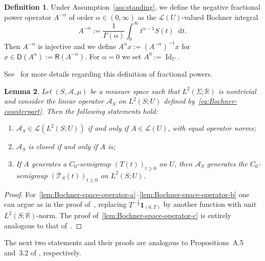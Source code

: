 \documentclass[reqno]{amsart}
\numberwithin{equation}{section}
\newcommand{\R}{\mathbb{R}}
\newcommand{\cA}{\mathcal{A}}
\newcommand{\cT}{\mathcal{T}}
\newcommand{\rd}{\mathop{}\!\mathrm{d}}
\newcommand{\id}{\operatorname{Id}}
\newtheorem{lemma}{Lemma}[section]
\theoremstyle{remark}
\theoremstyle{definition}
\newtheorem{definition}[lemma]{Definition}
\begin{document}
\begin{definition}\label{def:frac-power-Hille-Phillips}
	Under Assumption~\ref{ass:standing}, we define
	the negative fractional power operator $A^{-\alpha}$ of order $\alpha \in (0,\infty)$ 
	as the $\mathscr L(U)$-valued Bochner integral
	\begin{equation}\label{eq:def-frac-power-Hille-Phillips}
		A^{-\alpha}
		:=
		\frac{1}{\Gamma(\alpha)}
		\int_0^\infty 
		t^{\alpha-1} S(t) \rd t.
	\end{equation}
	Then $A^{-\alpha}$ is injective and we define
	$A^\alpha x := (A^{-\alpha})^{-1} x$ for 
	$x \in \mathsf D(A^\alpha) := \mathsf R(A^{-\alpha})$.
	For $\alpha = 0$ we set $A^0 := \id_U$.
\end{definition}
%
See~\cite[Section~2.6]{Pazy1983} for more details regarding
this definition of fractional powers.

\begin{lemma}\label{lem:Bochner-space-operator}
	Let $(S, \mathscr A, \mu)$ be a measure space
	such that $L^2(\Sigma; \R)$ is nontrivial and consider the linear
	operator $\cA_S$ on $L^2(S; U)$
	defined by~\eqref{eq:Bochner-counterpart}.
	Then the following statements hold:
	\begin{enumerate}[leftmargin=1cm, label={\normalfont(\alph*)}]
		\item\label{lem:Bochner-space-operator-a} 
		$\mathcal A_S \in \mathscr L(L^2(S; U))$ if and only if 
		$A \in \mathscr L(U)$, with equal operator norms;
		\item\label{lem:Bochner-space-operator-b}
		$\mathcal A_S$ is closed if and only if $A$ is;
		\item \label{lem:Bochner-space-operator-c}
		If $A$ generates a $C_0$-semigroup $(T(t))_{t\ge0}$ on $U$, 
		then
		$\cA_S$ generates the $C_0$-semigroup $(\cT_S(t))_{t\ge0}$ on 
		$L^2(S; U)$.
	\end{enumerate}
\end{lemma}

\begin{proof}
	For~\ref{lem:Bochner-space-operator-a}--\ref{lem:Bochner-space-operator-b} 
	one can argue as in the proof of~\cite[Lemma~A.1]{KW2022}, 
	replacing $T^{-\frac{1}{2}} \mathbf 1_{(0,T)}$
	by 
	another function with unit $L^2(S; \R)$-norm.
	The proof of~\ref{lem:Bochner-space-operator-c} is entirely analogous to
	that of~\cite[Proposition~A.3]{KW2022}.
\end{proof}

The next two statements and their proofs are analogous
to Propositions~A.5 and~3.2 of \cite{KW2022}, respectively.
\end{document}
